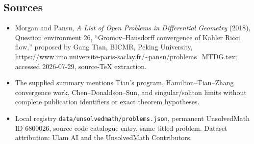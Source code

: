 \documentclass[11pt]{article}
\begin{document}
\subsection{Sources}
\begin{itemize}
\item Morgan and Pansu, \emph{A List of Open Problems in Differential Geometry} (2018), Question environment 26, ``Gromov--Hausdorff convergence of K\"ahler Ricci flow,'' proposed by Gang Tian, BICMR, Peking University, \url{https://www.imo.universite-paris-saclay.fr/~pansu/problems_MTDG.tex}; accessed 2026-07-29, source-TeX extraction.
\item The supplied summary mentions Tian's program, Hamilton--Tian--Zhang convergence work, Chen--Donaldson--Sun, and singular/soliton limits without complete publication identifiers or exact theorem hypotheses.
\item Local registry \texttt{data/unsolvedmath/problems.json}, permanent UnsolvedMath ID $6800026$, source code catalogue entry, same titled problem. Dataset attribution: Ulam AI and the UnsolvedMath Contributors.
\end{itemize}
\end{document}
